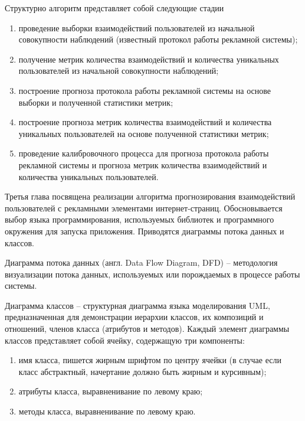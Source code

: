 \documentclass[a4paper, 14pt, oneside]{extarticle}
\begin{document}
    Структурно алгоритм представляет собой следующие стадии
    \begin{enumerate}
        \item проведение выборки взаимодействий пользователей из начальной совокупности наблюдений (известный протокол
        работы рекламной системы);
        \item получение метрик количества взаимодействий и количества уникальных пользователей из начальной совокупности 
        наблюдений;
        \item построение прогноза протокола работы рекламной системы на основе выборки и полученной статистики метрик;
        \item построение прогноза метрик количества взаимодействий и количества уникальных пользователей на основе 
        полученной статистики метрик;
        \item проведение калибровочного процесса для прогноза протокола работы рекламной системы и прогноза метрик количества
        взаимодействий и количества уникальных пользователей.
    \end{enumerate}

    Третья глава посвящена реализации алгоритма прогнозирования взаимодействий пользователей с рекламными элементами
    интернет-страниц. Обосновывается выбор языка программирования, используемых библиотек и программного окружения
    для запуска приложения. Приводятся диаграммы потока данных и классов.

    Диаграмма потока данных (англ. Data Flow Diagram, DFD) -- методология визуализации потока данных, используемых или
    порождаемых в процессе работы системы.

    

    Диаграмма классов -- структурная диаграмма языка моделирования UML, предназначенная для демонстрации иерархии классов,
    их композиций и отношений, членов класса (атрибутов и методов). Каждый элемент диаграммы классов представляет собой
    ячейку, содержащую три компоненты:
    \begin{enumerate}
        \item имя класса, пишется жирным шрифтом по центру ячейки (в случае если класс абстрактный, начертание должно быть жирным
        и курсивным);
        \item атрибуты класса, выравненивание по левому краю;
        \item методы класса, выравненивание по левому краю.
    \end{enumerate}
\end{document}
